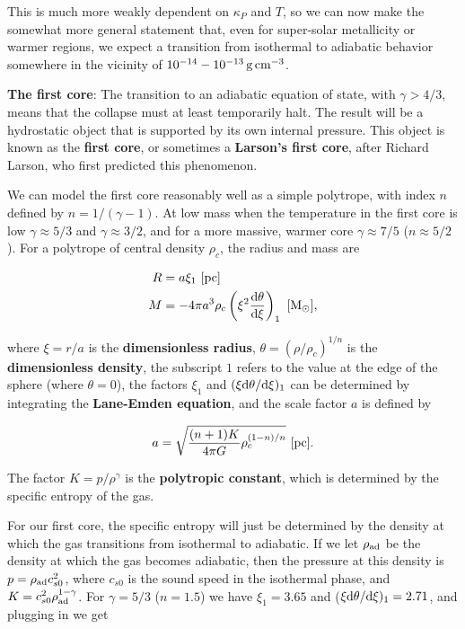 \documentclass[a4paper,10pt]{article}
\begin{document}
{\noindent}This is much more weakly dependent on $\kappa_P$ and $T$, so we can now make the somewhat more general statement that, even for super-solar metallicity or warmer regions, we expect a transition from isothermal to adiabatic behavior somewhere in the vicinity of $10^{-14}-10^{-13}\,{\rm g\,cm^{-3}}$.

{\noindent}\textbf{The first core}: The transition to an adiabatic equation of state, with $\gamma>4/3$, means that the collapse must at least temporarily halt. The result will be a hydrostatic object that is supported by its own internal pressure. This object is known as the \textbf{first core}, or sometimes a \textbf{Larson's first core}, after Richard Larson, who first predicted this phenomenon.

{\noindent}We can model the first core reasonably well as a simple polytrope, with index $n$ defined by $n=1/(\gamma-1)$. At low mass when the temperature in the first core is low $\gamma\approx5/3$ and $\gamma\approx3/2$, and for a more massive, warmer core $\gamma\approx7/5$ ($n\approx5/2$). For a polytrope of central density $\rho_c$, the radius and mass are

\begin{align*}
    R &= a\xi_1 ~ [{\rm pc}]\\
    M &= -4\pi a^3\rho_c \left(\xi^2\frac{{\rm d}\theta}{{\rm d}\xi}\right)_1 ~ [{\rm M_\odot}],
\end{align*}

{\noindent}where $\xi=r/a$ is the \textbf{dimensionless radius}, $\theta=(\rho/\rho_c)^{1/n}$ is the \textbf{dimensionless density}, the subscript $1$ refers to the value at the edge of the sphere (where $\theta=0$), the factors $\xi_1$ and $(\xi{\rm d}\theta/{\rm d}\xi)_1$ can be determined by integrating the \textbf{Lane-Emden equation}, and the scale factor $a$ is defined by

\begin{align*}
    a = \sqrt{\frac{(n+1)K}{4\pi G}\rho_c^{(1-n)/n}} ~ [{\rm pc}].
\end{align*}

{\noindent}The factor $K=p/\rho^\gamma$ is the \textbf{polytropic constant}, which is determined by the specific entropy of the gas.

{\noindent}For our first core, the specific entropy will just be determined by the density at which the gas transitions from isothermal to adiabatic. If we let $\rho_{\rm ad}$ be the density at which the gas becomes adiabatic, then the pressure at this density is $p=\rho_{\rm ad}c_{s0}^2$, where $c_{s0}$ is the sound speed in the isothermal phase, and $K=c_{s0}^2\rho_{\rm ad}^{1-\gamma}$. For $\gamma=5/3$ ($n=1.5$) we have $\xi_1=3.65$ and ($\xi{\rm d}\theta/{\rm d}\xi)_1=2.71$, and plugging in we get
\end{document}
